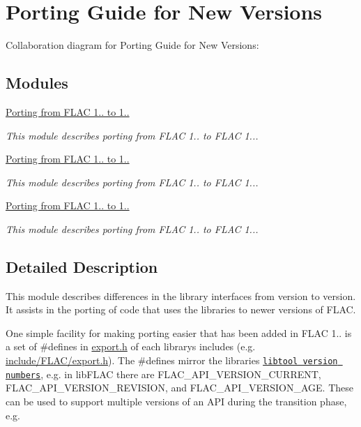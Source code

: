 \hypertarget{group__porting}{}\section{Porting Guide for New Versions}
\label{group__porting}
Collaboration diagram for Porting Guide for New Versions\+:
\subsection*{Modules}
\begin{DoxyCompactItemize}
\item 
\hyperlink{group__porting__1__1__2__to__1__1__3}{Porting from F\+L\+A\+C 1.. to 1..}
\begin{DoxyCompactList}\small\item\em This module describes porting from F\+L\+AC 1.. to F\+L\+AC 1... \end{DoxyCompactList}\item 
\hyperlink{group__porting__1__1__3__to__1__1__4}{Porting from F\+L\+A\+C 1.. to 1..}
\begin{DoxyCompactList}\small\item\em This module describes porting from F\+L\+AC 1.. to F\+L\+AC 1... \end{DoxyCompactList}\item 
\hyperlink{group__porting__1__1__4__to__1__2__0}{Porting from F\+L\+A\+C 1.. to 1..}
\begin{DoxyCompactList}\small\item\em This module describes porting from F\+L\+AC 1.. to F\+L\+AC 1... \end{DoxyCompactList}\end{DoxyCompactItemize}


\subsection{Detailed Description}
This module describes differences in the library interfaces from version to version. It assists in the porting of code that uses the libraries to newer versions of F\+L\+AC.

One simple facility for making porting easier that has been added in F\+L\+AC 1.. is a set of {\ttfamily \#defines} in {\ttfamily \hyperlink{export_8h}{export.\+h}} of each library\textquotesingle{}s includes (e.\+g. {\ttfamily \hyperlink{export_8h}{include/\+F\+L\+A\+C/export.\+h}}). The {\ttfamily \#defines} mirror the libraries\textquotesingle{} \href{http://www.gnu.org/software/libtool/manual/libtool.html#Libtool-versioning}{\tt libtool version numbers}, e.\+g. in lib\+F\+L\+AC there are {\ttfamily F\+L\+A\+C\+\_\+\+A\+P\+I\+\_\+\+V\+E\+R\+S\+I\+O\+N\+\_\+\+C\+U\+R\+R\+E\+NT}, {\ttfamily F\+L\+A\+C\+\_\+\+A\+P\+I\+\_\+\+V\+E\+R\+S\+I\+O\+N\+\_\+\+R\+E\+V\+I\+S\+I\+ON}, and {\ttfamily F\+L\+A\+C\+\_\+\+A\+P\+I\+\_\+\+V\+E\+R\+S\+I\+O\+N\+\_\+\+A\+GE}. These can be used to support multiple versions of an A\+PI during the transition phase, e.\+g.


